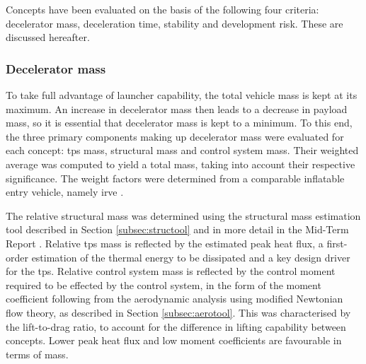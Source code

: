 Concepts have been evaluated on the basis of the following four criteria: decelerator mass, deceleration time, stability and development risk. These are discussed hereafter.

\subsubsection{Decelerator mass}
To take full advantage of launcher capability, the total vehicle mass is kept at its maximum. An increase in decelerator mass then leads to a decrease in payload mass, so it is essential that decelerator mass is kept to a minimum. To this end, the three primary components making up decelerator mass were evaluated for each concept: \gls{tps} mass, structural mass and control system mass. Their weighted average was computed to yield a total mass, taking into account their respective significance. The weight factors were determined from a comparable inflatable entry vehicle, namely \gls{irve} \cite{Hughes2005}.

The relative structural mass was determined using the structural mass estimation tool described in Section \ref{subsec:structool} and in more detail in the Mid-Term Report \cite[p.47-66]{Balasooriyan2015b}. Relative \gls{tps} mass is reflected by the estimated peak heat flux, a first-order estimation of the thermal energy to be dissipated and a key design driver for the \gls{tps}. Relative control system mass is reflected by the control moment required to be effected by the control system, in the form of the moment coefficient following from the aerodynamic analysis using modified Newtonian flow theory, as described in Section \ref{subsec:aerotool}. This was characterised by the lift-to-drag ratio, to account for the difference in lifting capability between concepts. Lower peak heat flux and low moment coefficients are favourable in terms of mass. 

